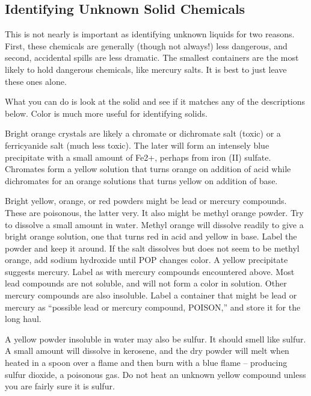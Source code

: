 \begin{itemize}
{\section{Identifying Unknown Solid Chemicals}

This is not nearly is important as identifying unknown liquids 
for two reasons. 
First, 
these chemicals are generally (though not always!) less dangerous, 
and second, 
accidental spills are less dramatic. 
The smallest containers are the most likely to hold dangerous chemicals, 
like mercury salts. 
It is best to just leave these ones alone.

What you can do is look at the solid 
and see if it matches any of the descriptions below.
Color is much more useful for identifying solids.
\item{Bright orange crystals are likely a chromate 
or dichromate salt (toxic) or a ferricyanide salt (much less toxic). 
The later will form an intensely blue precipitate 
with a small amount of Fe2+, 
perhaps from iron (II) sulfate. 
Chromates form a yellow solution that turns orange 
on addition of acid while dichromates for an orange solutions 
that turns yellow on addition of base.}

\item{Bright yellow, 
orange, 
or red powders might be lead or mercury compounds. 
These are poisonous, 
the latter very. 
It also might be methyl orange powder. 
Try to dissolve a small amount in water. 
Methyl orange will dissolve readily to give a bright orange solution, 
one that turns red in acid and yellow in base. 
Label the powder and keep it around. 
If the salt dissolves but does not seem to be methyl orange, 
add sodium hydroxide until POP changes color. 
A yellow precipitate suggests mercury. 
Label as with mercury compounds encountered above. 
Most lead compounds are not soluble, 
and will not form a color in solution. 
Other mercury compounds are also insoluble. 
Label a container that might be lead or mercury as 
“possible lead or mercury compound, 
POISON,” and store it for the long haul.}

\item{A yellow powder insoluble in water may also be sulfur. 
It should smell like sulfur. 
A small amount will dissolve in kerosene, 
and the dry powder will melt when heated in a spoon 
over a flame and then burn with a blue flame – 
producing sulfur dioxide, 
a poisonous gas. 
Do not heat an unknown yellow compound 
unless you are fairly sure it is sulfur.}

}
\end{itemize}
